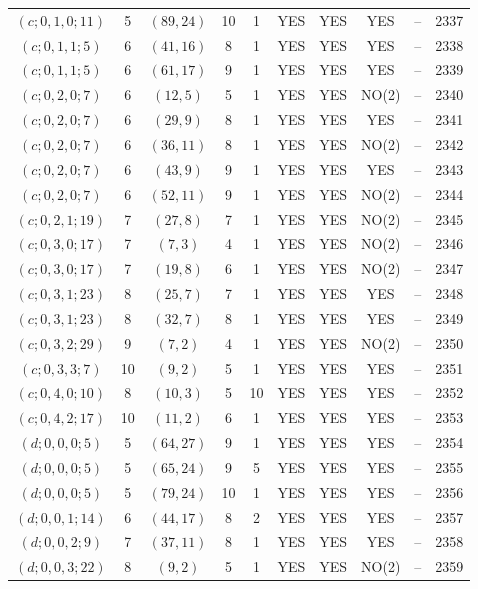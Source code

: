 \begin{longtable}{|c|c|c|c|c|c|c|c|c|c|}
$(c; 0, 1, 0; 11)$ & 5 & $(89, 24)$ & 10 & 1 & YES & YES & YES & -- & 2337\\
$(c; 0, 1, 1; 5)$ & 6 & $(41, 16)$ & 8 & 1 & YES & YES & YES & -- & 2338\\
$(c; 0, 1, 1; 5)$ & 6 & $(61, 17)$ & 9 & 1 & YES & YES & YES & -- & 2339\\
$(c; 0, 2, 0; 7)$ & 6 & $(12, 5)$ & 5 & 1 & YES & YES & NO(2) & -- & 2340\\
$(c; 0, 2, 0; 7)$ & 6 & $(29, 9)$ & 8 & 1 & YES & YES & YES & -- & 2341\\
$(c; 0, 2, 0; 7)$ & 6 & $(36, 11)$ & 8 & 1 & YES & YES & NO(2) & -- & 2342\\
$(c; 0, 2, 0; 7)$ & 6 & $(43, 9)$ & 9 & 1 & YES & YES & YES & -- & 2343\\
$(c; 0, 2, 0; 7)$ & 6 & $(52, 11)$ & 9 & 1 & YES & YES & NO(2) & -- & 2344\\
$(c; 0, 2, 1; 19)$ & 7 & $(27, 8)$ & 7 & 1 & YES & YES & NO(2) & -- & 2345\\
$(c; 0, 3, 0; 17)$ & 7 & $(7, 3)$ & 4 & 1 & YES & YES & NO(2) & -- & 2346\\
$(c; 0, 3, 0; 17)$ & 7 & $(19, 8)$ & 6 & 1 & YES & YES & NO(2) & -- & 2347\\
$(c; 0, 3, 1; 23)$ & 8 & $(25, 7)$ & 7 & 1 & YES & YES & YES & -- & 2348\\
$(c; 0, 3, 1; 23)$ & 8 & $(32, 7)$ & 8 & 1 & YES & YES & YES & -- & 2349\\
$(c; 0, 3, 2; 29)$ & 9 & $(7, 2)$ & 4 & 1 & YES & YES & NO(2) & -- & 2350\\
$(c; 0, 3, 3; 7)$ & 10 & $(9, 2)$ & 5 & 1 & YES & YES & YES & -- & 2351\\
$(c; 0, 4, 0; 10)$ & 8 & $(10, 3)$ & 5 & 10 & YES & YES & YES & -- & 2352\\
$(c; 0, 4, 2; 17)$ & 10 & $(11, 2)$ & 6 & 1 & YES & YES & YES & -- & 2353\\
$(d; 0, 0, 0; 5)$ & 5 & $(64, 27)$ & 9 & 1 & YES & YES & YES & -- & 2354\\
$(d; 0, 0, 0; 5)$ & 5 & $(65, 24)$ & 9 & 5 & YES & YES & YES & -- & 2355\\
$(d; 0, 0, 0; 5)$ & 5 & $(79, 24)$ & 10 & 1 & YES & YES & YES & -- & 2356\\
$(d; 0, 0, 1; 14)$ & 6 & $(44, 17)$ & 8 & 2 & YES & YES & YES & -- & 2357\\
$(d; 0, 0, 2; 9)$ & 7 & $(37, 11)$ & 8 & 1 & YES & YES & YES & -- & 2358\\
$(d; 0, 0, 3; 22)$ & 8 & $(9, 2)$ & 5 & 1 & YES & YES & NO(2) & -- & 2359\\

\end{longtable}
